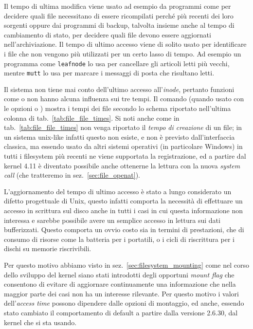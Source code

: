 Il tempo di ultima modifica viene usato ad esempio da programmi come
 per decidere quali file necessitano di essere ricompilati perché
più recenti dei loro sorgenti oppure dai programmi di backup, talvolta insieme
anche al tempo di cambiamento di stato, per decidere quali file devono essere
aggiornati nell'archiviazione.  Il tempo di ultimo accesso viene di solito
usato per identificare i file che non vengono più utilizzati per un certo
lasso di tempo. Ad esempio un programma come \texttt{leafnode} lo usa per
cancellare gli articoli letti più vecchi, mentre \texttt{mutt} lo usa per
marcare i messaggi di posta che risultano letti.  

Il sistema non tiene mai conto dell'ultimo accesso all'\textit{inode},
pertanto funzioni come  o  non hanno alcuna influenza
sui tre tempi. Il comando  (quando usato con le opzioni  o
) mostra i tempi dei file secondo lo schema riportato nell'ultima
colonna di tab.~\ref{tab:file_file_times}. Si noti anche come in
tab.~\ref{tab:file_file_times} non venga riportato il \textsl{tempo di
  creazione} di un file; in un sistema unix-like infatti questo non esiste, e
non è previsto dall'interfaccia classica, ma essendo usato da altri sistemi
operativi (in particolare Windows) in tutti i filesystem più recenti ne viene
supportata la registrazione, ed a partire dal kernel 4.11 è diventato
possibile anche ottenerne la lettura con la nuova \textit{system call}
 (che tratteremo in sez.~\ref{sec:file_openat}).

L'aggiornamento del tempo di ultimo accesso è stato a lungo considerato un
difetto progettuale di Unix, questo infatti comporta la necessità di
effettuare un accesso in scrittura sul disco anche in tutti i casi in cui
questa informazione non interessa e sarebbe possibile avere un semplice
accesso in lettura sui dati bufferizzati. Questo comporta un ovvio costo sia
in termini di prestazioni, che di consumo di risorse come la batteria per i
portatili, o i cicli di riscrittura per i dischi su memorie riscrivibili.

Per questo motivo abbiamo visto in sez.~\ref{sec:filesystem_mounting} come nel
corso dello sviluppo del kernel siano stati introdotti degli opportuni
\textit{mount flag} che consentono di evitare di aggiornare continuamente una
informazione che nella maggior parte dei casi non ha un interesse
rilevante. Per questo motivo i valori dell'\textit{access time} possono
dipendere dalle opzioni di montaggio, ed anche, essendo stato cambiato il
comportamento di default a partire dalla versione 2.6.30, dal kernel che si
sta usando.

